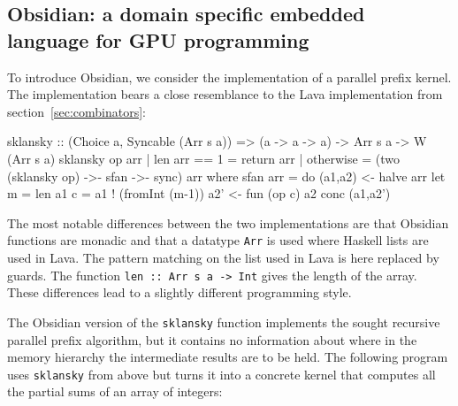 
\subsection{Obsidian: a domain specific embedded language for GPU programming}
\label{sec:obsidian}

To introduce Obsidian, we consider the implementation of a parallel prefix 
kernel. The implementation bears a close resemblance to the Lava implementation 
from section~\ref{sec:combinators}:

                                   


\begin{code}
sklansky :: (Choice a, Syncable (Arr s a)) => 
             (a -> a -> a) -> Arr s a -> W (Arr s a) 
sklansky op arr 
   | len arr == 1 = return arr
   | otherwise = (two (sklansky op) ->- sfan ->- sync) arr
    where sfan arr = do 
            (a1,a2) <- halve arr
            let m = len a1
                c = a1 ! (fromInt (m-1))
            a2' <- fun (op c) a2
            conc (a1,a2')

\end{code}
The most notable differences between the two implementations are that Obsidian 
functions are monadic and that a datatype {\tt Arr} is used where Haskell lists
are used in Lava. The pattern matching on the list used in Lava is here 
replaced by guards. The function {\tt len :: Arr s a -> Int} gives the 
length of the array. These differences lead to a slightly different programming
style.


The Obsidian version of the {\tt sklansky} function implements the sought
recursive parallel prefix algorithm, but it 
contains no information about where in the memory hierarchy the intermediate
results are to be held. The following program uses {\tt sklansky} from 
above but turns it into a concrete kernel that computes all the partial sums
of an array of integers: 

